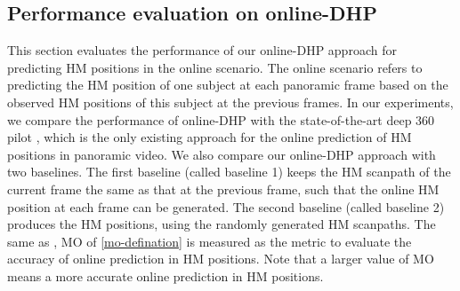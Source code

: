 \documentclass[10pt,journal,compsoc]{IEEEtran}
\begin{document}

\subsection{Performance evaluation on online-DHP}\label{sec:evaluation_online}
\label{online-compare}




This section evaluates the performance of our online-DHP approach for predicting HM positions in the online scenario.
The online scenario refers to predicting the HM position of one subject at each panoramic frame based on the observed HM positions of this subject at the previous frames.
In our experiments, we compare the performance of online-DHP with the state-of-the-art deep 360 pilot \cite{hu2017deep}, which is the only existing approach for the online prediction of HM positions in panoramic video.
We also compare our online-DHP approach with two baselines. The first baseline (called baseline 1) keeps the HM scanpath of the current frame the same as that at the previous frame, such that the online HM position at each frame can be generated.
The second baseline (called baseline 2) produces the HM positions, using the randomly generated HM scanpaths. The same as \cite{hu2017deep}, MO of \eqref{mo-defination} is measured as the metric to evaluate the accuracy of online prediction in HM positions. Note that a larger value of MO means a more accurate online prediction in HM positions.
\end{document}
